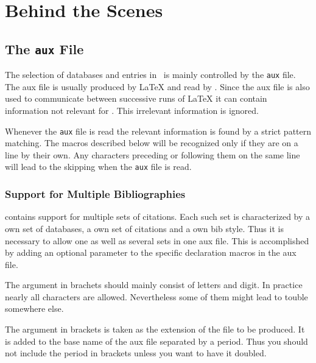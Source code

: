 
\chapter{Behind the Scenes}

\section{The \texttt{aux} File}


 The selection of databases and entries in \ExBib\ is mainly
controlled by the \texttt{aux} file. The aux file is usually produced
by \LaTeX{} and read by \ExBib. Since the aux file
is also used to communicate between successive runs of
\LaTeX{} it can contain information not relevant for
\ExBib. This irrelevant information is ignored.

Whenever the \texttt{aux} file is read the relevant information is
found by a strict pattern matching. The macros described below will be
recognized only if they are on a line by their own. Any characters
preceding or following them on the same line will lead to the
skipping when the \texttt{aux} file is read.

\subsection{Support for Multiple Bibliographies}

\ExBib{} contains support for multiple sets of citations. Each
such set is characterized by a own set of databases, a own set of
citations and a own bib style. Thus it is necessary to allow one as
well as several sets in one aux file. This is accomplished by adding
an optional parameter to the specific declaration macros in the aux
file.

The argument in brachets should mainly consist of letters and digit.
In practice nearly all characters are allowed. Nevertheless some of
them might lead to touble somewhere else.

The argument in brackets is taken as the extension of the file to be
produced. It is added to the base name of the aux file separated by a
period. Thus you should not include the period in brackets unless you
want to have it doubled.


